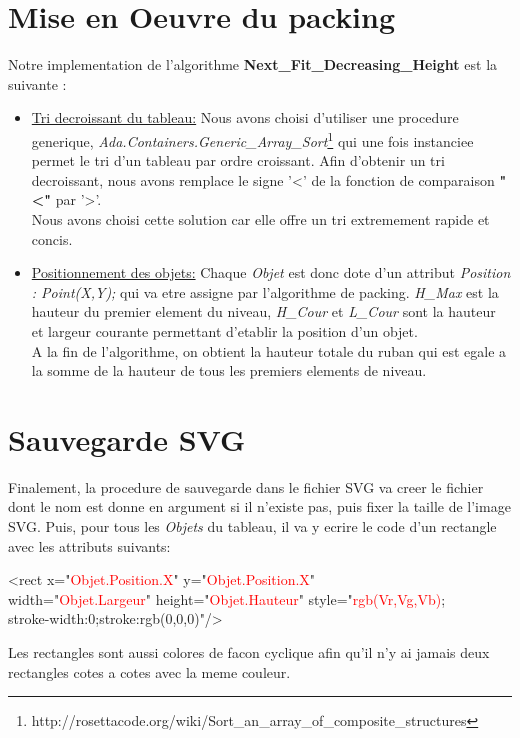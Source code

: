 \documentclass{article}
\begin{document}
\section {Mise en Oeuvre du packing}
Notre implementation de l'algorithme \textbf{Next\_Fit\_Decreasing\_Height} est la suivante :
\begin{itemize}
  \item \underline{Tri decroissant du tableau:} Nous avons choisi d'utiliser une procedure generique, \textit{Ada.Containers.Generic\_Array\_Sort}\footnote{http://rosettacode.org/wiki/Sort\_an\_array\_of\_composite\_structures} qui une fois instanciee permet le tri d'un tableau par ordre croissant. Afin d'obtenir un tri decroissant, nous avons remplace le signe '<' de la fonction de comparaison \textbf{"<"} par '>'.\\
\noindent Nous avons choisi cette solution car elle offre un tri extremement rapide et concis.
  \item \underline{Positionnement des objets:} Chaque \textit{Objet} est donc dote d'un attribut \emph{Position : Point(X,Y);} qui va etre assigne par l'algorithme de packing. \textit{H\_Max} est la hauteur du premier element du niveau, \textit{H\_Cour} et \textit{L\_Cour} sont la hauteur et largeur courante permettant d'etablir la position d'un objet. \\
A la fin de l'algorithme, on obtient la hauteur totale du ruban qui est egale a la somme de la hauteur de tous les premiers elements de niveau.
\end{itemize}

\section {Sauvegarde SVG}
Finalement, la procedure de sauvegarde dans le fichier SVG va creer le fichier dont le nom est donne en argument si il n'existe pas, puis fixer la taille de l'image SVG. Puis, pour tous les \textit{Objets} du tableau, il va y ecrire le code d'un rectangle avec les attributs suivants:

\begin{framed}
\small \noindent
<rect x="\textcolor{red}{Objet.Position.X}" y="\textcolor{red}{Objet.Position.X}" \\
width="\textcolor{red}{Objet.Largeur}" height="\textcolor{red}{Objet.Hauteur}" 
        style="\textcolor{red}{rgb(Vr,Vg,Vb)};\\
        stroke-width:0;stroke:rgb(0,0,0)"/>
\end{framed}

Les rectangles sont aussi colores de facon cyclique afin qu'il n'y ai jamais deux rectangles cotes a cotes avec la meme couleur.
\end{document}
